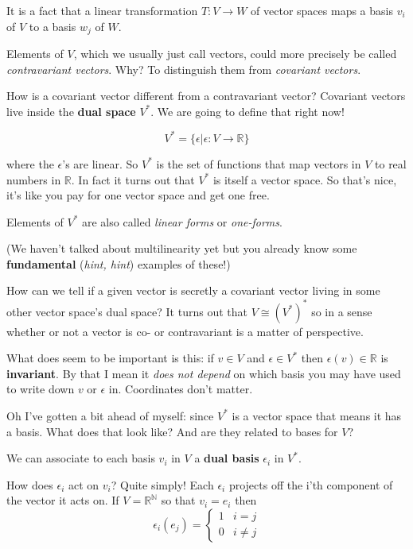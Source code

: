 \documentclass{article}
\begin{document}
It is a fact that a linear transformation $T : V \to W$ of vector spaces maps a
basis $v_{i}$ of $V$ to a basis $w_{j}$ of $W$.

Elements of $V$, which we usually just call vectors, could more precisely be
called \textsl{contravariant vectors}. Why? To distinguish them from
\textsl{covariant vectors}.

How is a covariant vector different from a contravariant vector? Covariant
vectors live inside the \textbf{dual space} $V^{*}$. We are going to define that
right now!

\[ V^{*} = \{ \epsilon | \epsilon : V \to \mathbb{R} \} \]

where the $\epsilon$'s are linear. So $V^{*}$ is the set of functions that map
vectors in $V$ to real numbers in $\mathbb{R}$. In fact it turns out that
$V^{*}$ is itself a vector space. So that's nice, it's like you pay for one
vector space and get one free.

Elements of $V^{*}$ are also called \textsl{linear forms} or \textsl{one-forms}.

(We haven't talked about multilinearity yet but you already know some
\textbf{fundamental} (\textsl{hint, hint}) examples of these!)

How can we tell if a given vector is secretly a covariant vector living in some
other vector space's dual space? It turns out that $V \cong (V^{*})^{*}$ so in a
sense whether or not a vector is co- or contravariant is a matter of
perspective.

What does seem to be important is this: if $v \in V$ and $\epsilon \in V^{*}$
then $\epsilon(v) \in \mathbb{R}$ is \textbf{invariant}. By that I mean it
\textsl{does not depend} on which basis you may have used to write down $v$ or
$\epsilon$ in. Coordinates don't matter.

Oh I've gotten a bit ahead of myself: since $V^{*}$ is a vector space that means
it has a basis. What does that look like? And are they related to bases for $V$?

We can associate to each basis $v_{i}$ in $V$ a \textbf{dual basis}
$\epsilon_{i}$ in $V^{*}$.

How does $\epsilon_{i}$ act on $v_{i}$? Quite simply! Each $\epsilon_{i}$
projects off the i'th component of the vector it acts on. If $V =
\mathbb{R^{N}}$ so that $v_{i} = e_{i}$ then
\begin{equation*}
  \epsilon_{i}(e_{j}) = \begin{cases}
    1 & i = j\\
    0 & i \neq j
  \end{cases}
\end{equation*}
\end{document}
